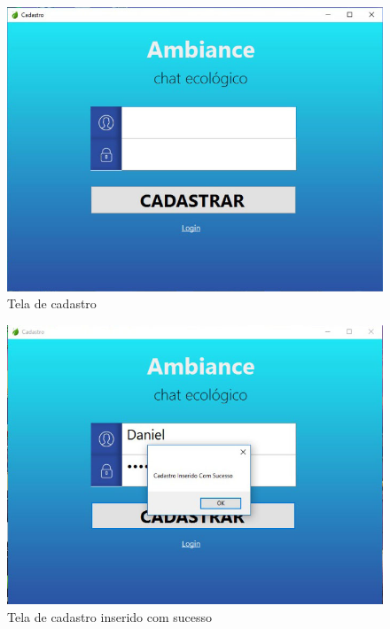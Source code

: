 \begin{figure}[!htb]
	\centering
	\includegraphics[scale=0.4]{img/t-pag-cadastro.jpeg}
	\caption{Tela de cadastro}
	\label{Tela de cadastro}
\end{figure}

\begin{figure}[!htb]
	\centering
	\includegraphics[scale=0.4]{img/t-cadastro-sucesso.jpeg}
	\caption{Tela de cadastro inserido com sucesso}
	\label{Tela de cadastro inserido com sucesso}
\end{figure}

